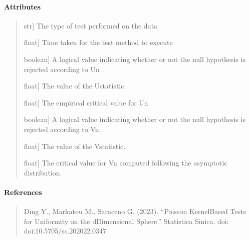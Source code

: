 \documentclass[letterpaper,10pt,english,openany,oneside]{sphinxmanual}
\begin{document}
\begin{fulllineitems}
\paragraph{Attributes}
\label{\detokenize{api_reference/generated/QuadratiK.poisson_kernel_test.PoissonKernelTest:attributes}}\begin{quote}
\begin{description}
\sphinxlineitem{test\_type\_}{[}str{]}
\sphinxAtStartPar
The type of test performed on the data

\sphinxlineitem{execution\_time}{[}float{]}
\sphinxAtStartPar
Time taken for the test method to execute

\sphinxlineitem{u\_statistic\_h0\_}{[}boolean{]}
\sphinxAtStartPar
A logical value indicating whether or not the null hypothesis 
is rejected according to Un

\sphinxlineitem{u\_statistic\_un\_}{[}float{]}
\sphinxAtStartPar
The value of the U\sphinxhyphen{}statistic.

\sphinxlineitem{u\_statistic\_cv\_}{[}float{]}
\sphinxAtStartPar
The empirical critical value for Un

\sphinxlineitem{v\_statistic\_h0\_}{[}boolean{]}
\sphinxAtStartPar
A logical value indicating whether or not the null hypothesis is 
rejected according to Vn.

\sphinxlineitem{v\_statistic\_vn\_}{[}float{]}
\sphinxAtStartPar
The value of the V\sphinxhyphen{}statistic.

\sphinxlineitem{v\_statistic\_cv\_}{[}float{]}
\sphinxAtStartPar
The critical value for Vn computed following the asymptotic distribution.

\end{description}
\end{quote}


\paragraph{References}
\label{\detokenize{api_reference/generated/QuadratiK.poisson_kernel_test.PoissonKernelTest:references}}\begin{quote}

\sphinxAtStartPar
Ding Y., Markatou M., Saraceno G. (2023). “Poisson Kernel\sphinxhyphen{}Based Tests for
Uniformity on the d\sphinxhyphen{}Dimensional Sphere.” Statistica Sinica. doi: doi:10.5705/ss.202022.0347
\end{quote}



\end{fulllineitems}
\end{document}
